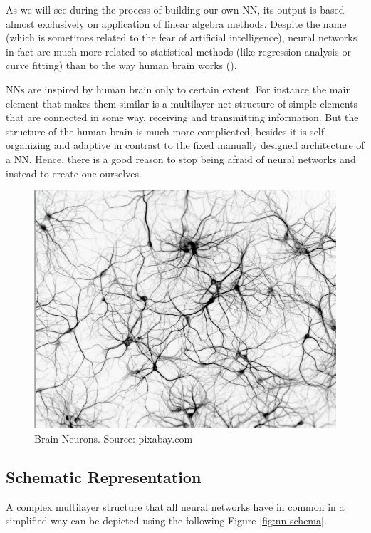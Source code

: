 As we will see during the process of building our own NN, its output is based almost exclusively on application of linear algebra methods. Despite the name (which is sometimes related to the fear of artificial intelligence), neural networks in fact are much more related to statistical methods (like regression analysis or curve fitting) than to the way human brain works (\cite{reid2014}). 

NNs are inspired by human brain only to certain extent. For instance the main element that makes them similar is a multilayer net structure of simple elements that are connected in some way, receiving and transmitting information. But the structure of the human brain is much more complicated, besides it is self-organizing and adaptive in contrast to the fixed manually designed architecture of a NN. Hence, there is a good reason to stop being afraid of neural networks and instead to create one ourselves.

\begin{figure}[H]
    \includegraphics[width=\linewidth]{pics/neurons_net3.png}
    \caption{\label{fig:real-neurons} Brain Neurons. Source: pixabay.com}
\end{figure}


\subsection{Schematic Representation}
A complex multilayer structure that all neural networks have in common in a simplified way can be depicted using the following Figure \ref{fig:nn-schema}.

